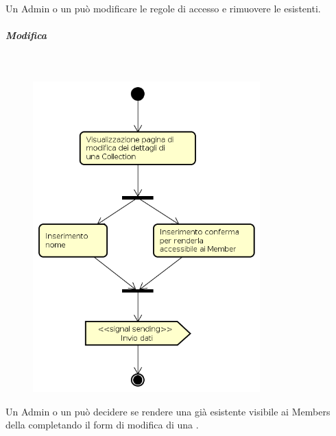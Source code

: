 Un Admin o un  può modificare le regole di accesso e rimuovere le  esistenti.
\newpage
\subparagraph{Modifica } \mbox{} \\
\begin{figure}[H]
\begin{center}
\includegraphics[height=12cm]{res/sections/backend/activities/modificaDatiCollection.png}
\end{center}
\end{figure}
Un Admin o un  può decidere se rendere una  già esistente visibile ai Members della  completando il form di modifica di una .
\newpage
